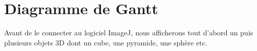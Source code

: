 \documentclass[11pt]{report}
\begin{document}

  
  
\chapter{Diagramme de Gantt} %
 Avant de le connecter au logiciel ImageJ, nous afficherons tout d'abord un puis plusieurs objets 3D dont un cube, une pyramide, une sphère etc.  
\end{document}
